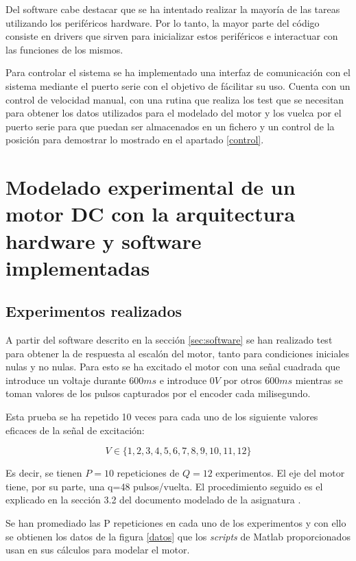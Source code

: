 \documentclass[a4paper]{article}
\begin{document}
Del software cabe destacar que se ha intentado realizar la mayoría de las tareas utilizando los periféricos hardware. Por lo tanto,
la mayor parte del código consiste en drivers que sirven para inicializar estos periféricos e interactuar con las funciones de los mismos.

Para controlar el sistema se ha implementado una interfaz de comunicación con el sistema mediante el puerto serie con el objetivo de fácilitar su uso.
Cuenta con un control de velocidad manual, con una rutina que realiza los test que se necesitan para obtener los datos utilizados para el modelado del motor y los vuelca
por el puerto serie para que puedan ser almacenados en un fichero y un control de la posición para demostrar lo mostrado en el apartado \ref{control}.

\section{Modelado experimental de un motor DC con la arquitectura hardware y software implementadas}
\subsection{Experimentos realizados \label{sec:exp}}
A partir del software descrito en la sección \ref{sec:software} se han realizado test para obtener la de respuesta al escalón del motor,
tanto para condiciones iniciales nulas y no nulas.
Para esto se ha excitado el motor con una señal cuadrada que introduce un voltaje durante $600ms$ e introduce $0V$ por otros $600ms$
mientras se toman valores de los pulsos capturados por el encoder cada milisegundo.

Esta prueba se ha repetido 10 veces para cada uno de los siguiente valores eficaces de la señal de excitación:

\begin{displaymath}
V \in \{1,2,3,4,5,6,7,8,9,10,11,12\}
\end{displaymath}

Es decir, se tienen $P=10$ repeticiones de $Q=12$ experimentos. El eje del motor tiene, por su parte, una q=48 pulsos/vuelta.
El procedimiento seguido es el explicado en la sección 3.2 del documento modelado de la asignatura \cite{modelado}.

Se han promediado las P repeticiones en cada uno de los experimentos y con ello se obtienen los datos de la figura \ref{datos} que los \emph{scripts}
de Matlab proporcionados usan en sus cálculos para modelar el motor.
\end{document}
